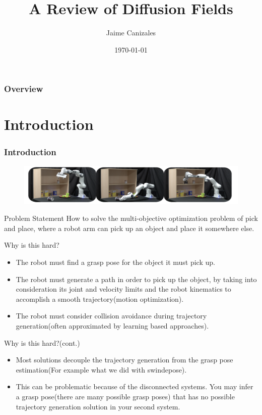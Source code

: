 \documentclass{beamer}
\title[Diffusion Fields]{A Review of Diffusion Fields}
\author{Jaime Canizales}
\institute[Hunter College] 
{
City University of New York \\ 
\medskip
\textit{jaime.canizales@hunter.cuny.edu} 
}
\date{\today}
\begin{document}
\begin{frame}
\titlepage 
\end{frame}


\begin{frame} \frametitle{Overview} 
\tableofcontents
\end{frame}


\section{Introduction}
\begin{frame}\frametitle{Introduction}
\begin{figure}
\includegraphics[width=12cm]{pick_place.png}
\end{figure}
\begin{block}{Problem Statement}
How to solve the multi-objective optimization problem of pick and place, where a robot arm can pick up an object and place it somewhere else.
\end{block}
\end{frame}


\begin{frame}{Why is this hard?}
\begin{itemize}
\item The robot must find a grasp pose for the object it must pick up.
\item  The robot must generate a path in order to pick up the object, by taking into consideration its joint and velocity limits and the robot kinematics to accomplish a smooth trajectory(motion optimization).
\item The robot must consider collision avoidance during trajectory generation(often approximated by learning based approaches).
\end{itemize}
\end{frame}


\begin{frame}{Why is this hard?(cont.)}
\begin{itemize} 
\item Most solutions decouple the trajectory generation from the grasp pose estimation(For example what we did with swindepose).
\item This can be problematic because of the disconnected systems. You may infer a grasp pose(there are many possible grasp poses) that has no possible trajectory generation solution in your second system.
\end{itemize}
\end{frame}
\end{document}
